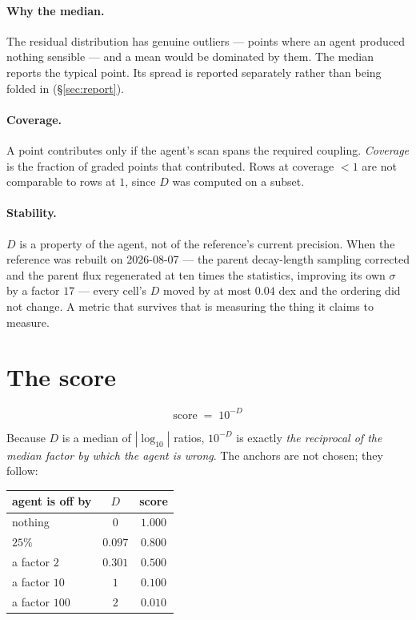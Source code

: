 \documentclass[11pt]{article}
\begin{document}
\paragraph{Why the median.} The residual distribution has genuine outliers ---
points where an agent produced nothing sensible --- and a mean would be
dominated by them. The median reports the typical point. Its spread is reported
separately rather than being folded in (\S\ref{sec:report}).

\paragraph{Coverage.} A point contributes only if the agent's scan spans the
required coupling. \emph{Coverage} is the fraction of graded points that
contributed. Rows at coverage $<1$ are not comparable to rows at $1$, since $D$
was computed on a subset.

\paragraph{Stability.} $D$ is a property of the agent, not of the reference's
current precision. When the reference was rebuilt on 2026-08-07 --- the parent
decay-length sampling corrected and the parent flux regenerated at ten times the
statistics, improving its own $\sigma$ by a factor $17$ --- every cell's $D$
moved by at most $0.04$ dex and the ordering did not change. A metric that
survives that is measuring the thing it claims to measure.

\section{The score}\label{sec:score}

\begin{equation}
  \boxed{\;\text{score} \;=\; 10^{-D}\;}
\end{equation}

Because $D$ is a median of $|\log_{10}|$ ratios, $10^{-D}$ is exactly
\emph{the reciprocal of the median factor by which the agent is wrong}. The
anchors are not chosen; they follow:

\begin{center}
\begin{tabular}{lcc}
\toprule
agent is off by & $D$ & score \\ \midrule
nothing            & $0$     & $1.000$ \\
$25\%$             & $0.097$ & $0.800$ \\
a factor $2$       & $0.301$ & $0.500$ \\
a factor $10$      & $1$     & $0.100$ \\
a factor $100$     & $2$     & $0.010$ \\
\bottomrule
\end{tabular}
\end{center}
\end{document}
